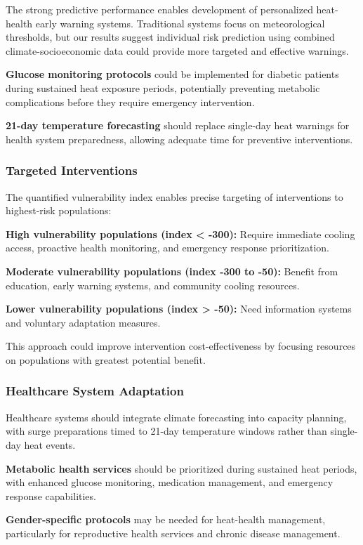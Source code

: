 \documentclass[11pt,a4paper]{article}
\begin{document}
The strong predictive performance enables development of personalized heat-health early warning systems. Traditional systems focus on meteorological thresholds, but our results suggest individual risk prediction using combined climate-socioeconomic data could provide more targeted and effective warnings.

\textbf{Glucose monitoring protocols} could be implemented for diabetic patients during sustained heat exposure periods, potentially preventing metabolic complications before they require emergency intervention.

\textbf{21-day temperature forecasting} should replace single-day heat warnings for health system preparedness, allowing adequate time for preventive interventions.

\subsubsection{Targeted Interventions}

The quantified vulnerability index enables precise targeting of interventions to highest-risk populations:

\textbf{High vulnerability populations (index < -300):} Require immediate cooling access, proactive health monitoring, and emergency response prioritization.

\textbf{Moderate vulnerability populations (index -300 to -50):} Benefit from education, early warning systems, and community cooling resources.

\textbf{Lower vulnerability populations (index > -50):} Need information systems and voluntary adaptation measures.

This approach could improve intervention cost-effectiveness by focusing resources on populations with greatest potential benefit.

\subsubsection{Healthcare System Adaptation}

Healthcare systems should integrate climate forecasting into capacity planning, with surge preparations timed to 21-day temperature windows rather than single-day heat events.

\textbf{Metabolic health services} should be prioritized during sustained heat periods, with enhanced glucose monitoring, medication management, and emergency response capabilities.

\textbf{Gender-specific protocols} may be needed for heat-health management, particularly for reproductive health services and chronic disease management.
\end{document}
